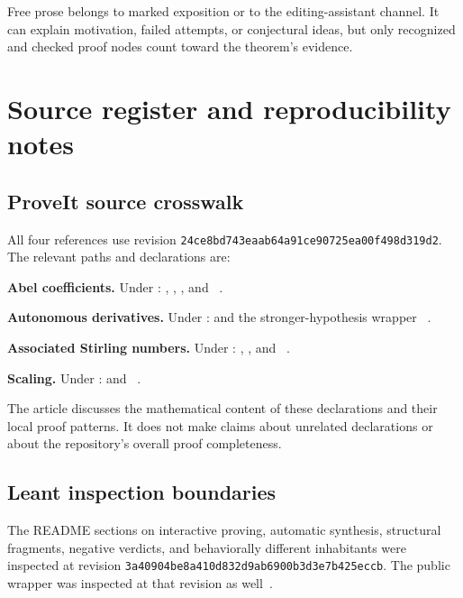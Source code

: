 \documentclass[11pt,a4paper]{article}
\theoremstyle{remark}
\begin{document}
Free prose belongs to marked exposition or to the editing-assistant channel. It can explain motivation, failed attempts, or conjectural ideas, but only recognized and checked proof nodes count toward the theorem's evidence.

\section{Source register and reproducibility notes}
\label{sec:source-register}

\subsection{ProveIt source crosswalk}

All four references use revision \texttt{24ce8bd743eaab64a91ce90725ea00f498d319d2}. The relevant paths and declarations are:

\textbf{Abel coefficients.} Under
:
,
,
, and
~\cite{proveit-abel}.

\textbf{Autonomous derivatives.} Under
:
 and the stronger-hypothesis wrapper
~\cite{proveit-deriv}.

\textbf{Associated Stirling numbers.} Under
:
,
, and
~\cite{proveit-stirling}.

\textbf{Scaling.} Under
:
 and
~\cite{proveit-scaling}.

The article discusses the mathematical content of these declarations and their local proof patterns. It does not make claims about unrelated declarations or about the repository's overall proof completeness.

\subsection{Leant inspection boundaries}

The README sections on interactive proving, automatic synthesis, structural fragments, negative verdicts, and behaviorally different inhabitants were inspected at revision \texttt{3a40904be8a410d832d9ab6900b3d3e7b425eccb}. The public wrapper
 was inspected at that revision as well~\cite{leant-readme,leant-selection}.
\end{document}
